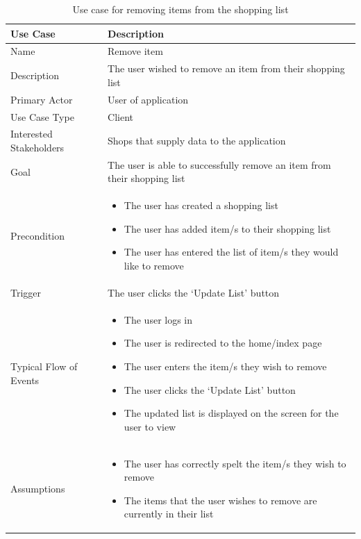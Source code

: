 \documentclass[10pt,twocolumn]{witseiepaper}
\begin{document}
		\begin{table}[htbp]
			\centering
			\caption{Use case for removing items from the shopping list}
			\label{uc:remove_item}
			\begin{tabular}{|p{}|p{}|}
				\hline
				\textbf{Use Case} & \textbf{Description} \\ \hline
				Name & Remove item \\ \hline
				Description & The user wished to remove an item from their shopping list \\ \hline
				Primary Actor & User of application \\ \hline
				Use Case Type & Client \\ \hline
				Interested Stakeholders & Shops that supply data to the application \\ \hline
				Goal & The user is able to successfully remove an item from their shopping list \\ \hline
				Precondition &
				\begin{itemize}
					\item The user has created a shopping list
					\item The user has added item/s to their shopping list
					\item The user has entered the list of item/s they would like to remove
				\end{itemize}
				\\ \hline
				Trigger & The user clicks the `Update List' button \\ \hline
				Typical Flow of Events & 
				\begin{itemize}
					\item The user logs in
					\item The user is redirected to the home/index page
					\item The user enters the item/s they wish to remove
					\item The user clicks the `Update List' button
					\item The updated list is displayed on the screen for the user to view
				\end{itemize}
				\\ \hline
				Assumptions & 
				\begin{itemize}
					\item The user has correctly spelt the item/s they wish to remove
					\item The items that the user wishes to remove are currently in their list
				\end{itemize}
				\\ \hline
			\end{tabular}
		\end{table}
		
\end{document}
